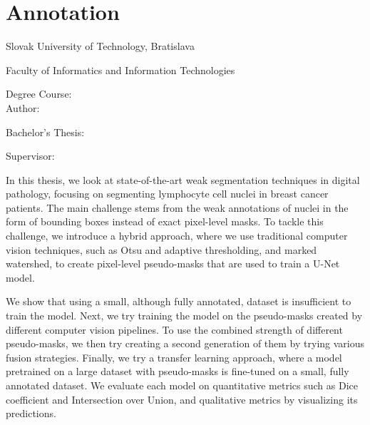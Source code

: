 
\thispagestyle{empty}

\section*{Annotation}

\begin{minipage}[t]{1\columnwidth}%
Slovak University of Technology, Bratislava 

Faculty of Informatics and Information Technologies

Degree Course: \myStudyProgram\\

Author: \myName

Bachelor's Thesis: \myTitle

Supervisor: \mySupervisor

\myDate%
\end{minipage}

\bigskip{}


In this thesis, we look at state-of-the-art weak segmentation techniques in digital pathology, focusing on segmenting lymphocyte cell nuclei in breast cancer patients. The main challenge stems from the weak annotations of nuclei in the form of bounding boxes instead of exact pixel-level masks. To tackle this challenge, we introduce a hybrid approach, where we use traditional computer vision techniques, such as Otsu and adaptive thresholding, and marked watershed, to create pixel-level pseudo-masks that are used to train a U-Net model. 

We show that using a small, although fully annotated, dataset is insufficient to train the model. Next, we try training the model on the pseudo-masks created by different computer vision pipelines. To use the combined strength of different pseudo-masks, we then try creating a second generation of them by trying various fusion strategies. Finally, we try a transfer learning approach, where a model pretrained on a large dataset with pseudo-masks is fine-tuned on a small, fully annotated dataset. We evaluate each model on quantitative metrics such as Dice coefficient and Intersection over Union, and qualitative metrics by visualizing its predictions.

